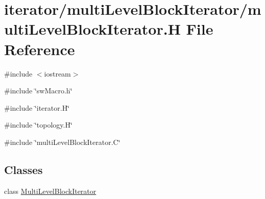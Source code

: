 \hypertarget{multiLevelBlockIterator_8H}{
\section{iterator/multiLevelBlockIterator/multiLevelBlockIterator.H File Reference}
\label{multiLevelBlockIterator_8H}
}
{\ttfamily \#include $<$iostream$>$}\par
{\ttfamily \#include \char`\"{}swMacro.h\char`\"{}}\par
{\ttfamily \#include \char`\"{}iterator.H\char`\"{}}\par
{\ttfamily \#include \char`\"{}topology.H\char`\"{}}\par
{\ttfamily \#include \char`\"{}multiLevelBlockIterator.C\char`\"{}}\par
\subsection*{Classes}
\begin{DoxyCompactItemize}
\item 
class \hyperlink{classMultiLevelBlockIterator}{MultiLevelBlockIterator}
\end{DoxyCompactItemize}
